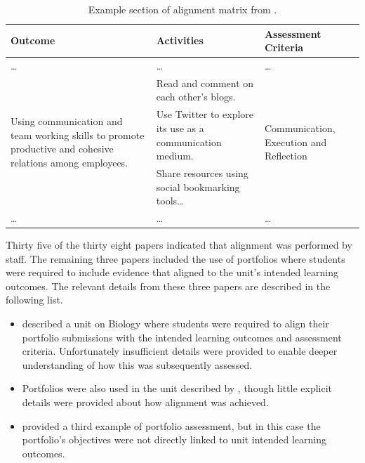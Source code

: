 \begin{table}[p]
	\centering
	\caption{Example section of alignment matrix from \citet{terrell2011using}.}
	\label{tbl:example_matrix}
	\footnotesize
    \begin{tabular}{p{4cm}|p{5cm}|p{3cm}}
     \textbf{Outcome} & \textbf{Activities} & \textbf{Assessment Criteria} \\ \hline
     \ldots & \ldots & \ldots \\
	\multirow{3}{4cm}{Using communication and team working skills to promote productive and cohesive relations among employees.} & 
	Read and comment on each other's blogs. & \multirow{3}{3cm}{Communication, Execution and Reflection} \\
	& Use Twitter to explore its use as a communication medium.
	&  \\
	& Share resources using social bookmarking tools\ldots & \\
	\ldots & \ldots & \ldots \\
    \end{tabular}
\end{table}

Thirty five of the thirty eight papers indicated that alignment was performed by staff. The remaining three papers included the use of portfolios where students were required to include evidence that aligned to the unit's intended learning outcomes. The relevant details from these three papers are described in the following list.

\begin{itemize}[noitemsep,nolistsep]
	\item \citet{hoddinott2000biggs} described a unit on Biology where students were required to align their portfolio submissions with the intended learning outcomes and assessment criteria. Unfortunately insufficient details were provided to enable deeper understanding of how this was subsequently assessed.
	\item Portfolios were also used in the unit described by \citet{scott2009promoting}, though little explicit details were provided about how alignment was achieved. 
	\item \citet{Tang:1999} provided a third example of portfolio assessment, but in this case the portfolio's objectives were not directly linked to unit intended learning outcomes.
\end{itemize}





